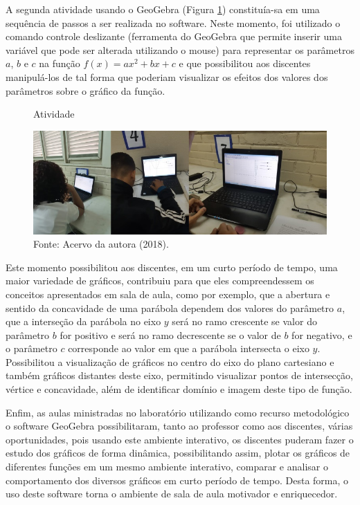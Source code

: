 \begin{refsection}
    A segunda atividade usando o GeoGebra (Figura \ref{fig:atividade-7}) constituía-sa em uma sequência de passos a ser realizada no software. Neste momento, foi utilizado o comando controle deslizante (ferramenta do GeoGebra que permite inserir uma variável que pode ser alterada utilizando o mouse) para representar os parâmetros $a$, $b$ e $c$ na função $f(x) = ax^2 + bx + c$ e que possibilitou aos discentes manipulá-los de tal forma que poderiam visualizar os efeitos dos valores dos parâmetros sobre o gráfico da função.

    \begin{figure}[ht]%
        \centering%
        \caption{Atividade}%
        \includegraphics[width=.80\textwidth]{articles/03-contribuicoes-do-sof/image14.jpeg}%
        \caption*{Fonte: Acervo da autora (2018).}%
        \label{fig:atividade-7}%
    \end{figure}%

    Este momento possibilitou aos discentes, em um curto período de tempo, uma maior variedade de gráficos, contribuiu para que eles compreendessem os conceitos apresentados em sala de aula, como por exemplo, que a abertura e sentido da concavidade de uma parábola dependem dos valores do parâmetro $a$, que a interseção da parábola no eixo $y$ será no ramo crescente se valor do parâmetro $b$ for positivo e será no ramo decrescente se o valor de $b$ for negativo, e o parâmetro $c$ corresponde ao valor em que a parábola intersecta o eixo $y$. Possibilitou a visualização de gráficos no centro do eixo do plano cartesiano e também gráficos distantes deste eixo, permitindo visualizar pontos de intersecção, vértice e concavidade, além de identificar domínio e imagem deste tipo de função. 

    Enfim, as aulas ministradas no laboratório utilizando como recurso metodológico o software GeoGebra possibilitaram, tanto ao professor como aos discentes, várias oportunidades, pois usando este ambiente interativo, os discentes puderam fazer o estudo dos gráficos de forma dinâmica, possibilitando assim, plotar os gráficos de diferentes funções em um mesmo ambiente interativo, comparar e analisar o comportamento dos diversos gráficos em curto período de tempo. Desta forma, o uso deste software torna o ambiente de sala de aula motivador e enriquecedor. 


\end{refsection}
